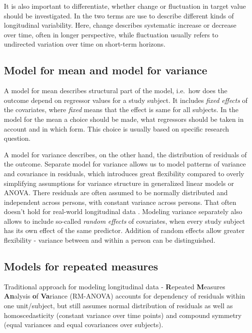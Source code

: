 \documentclass[
  12pt,
]{article}
\begin{document}
It is also important to differentiate, whether change or fluctuation in
target value should be investigated. In \textcite{hoffman_2015} the two
terms are use to describe different kinds of longitudinal variability.
Here, change describes systematic increase or decrease over time, often
in longer perspective, while fluctuation usually refers to undirected
variation over time on short-term horizons.

\subsection{Model for mean and model for
variance}\label{model-for-mean-and-model-for-variance}

A model for mean describes structural part of the model, i.e.~how does
the outcome depend on regressor values for a study subject. It includes
\emph{fixed effects} of the covariates, where \emph{fixed} means that
the effect is same for all subjects. In the model for the mean a choice
should be made, what regressors should be taken in account and in which
form. This choice is usually based on specific research question.

A model for variance describes, on the other hand, the distribution of
residuals of the outcome. Separate model for variance allows us to model
patterns of variance and covariance in residuals, which introduces great
flexibility compared to overly simplifying assumptions for variance
structure in generalized linear models or ANOVA. There residuals are
often assumed to be normally distributed and independent across persons,
with constant variance across persons. That often doesn't hold for
real-world longitudinal data \autocite{hoffman_2015}. Modeling variance
separately also allows to include so-called \emph{random effects} of
covariates, when every study subject has its own effect of the same
predictor. Addition of random effects allow greater flexibility -
variance between and within a person can be distinguished.

\subsection{Models for repeated
measures}\label{models-for-repeated-measures}

Traditional approach for modeling longitudinal data - \textbf{R}epeated
\textbf{M}easures \textbf{An}alysis \textbf{o}f \textbf{Va}riance
(RM-ANOVA) accounts for dependency of residuals within one unit/subject,
but still assumes normal distribution of residuals as well as
homoscedasticity (constant variance over time points) and compound
symmetry (equal variances and equal covariances over subjects).
\end{document}
